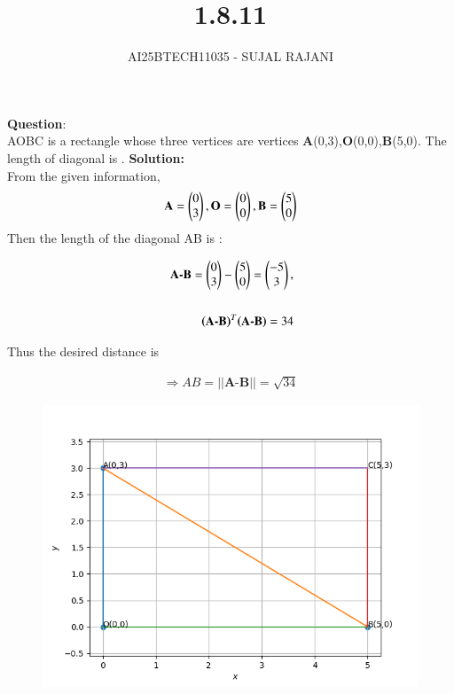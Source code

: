 \documentclass[journal,12pt,onecolumn]{IEEEtran}
\begin{document}
\title{1.8.11}
\author{AI25BTECH11035 - SUJAL RAJANI}
{\let\newpage\relax\maketitle}
\textbf{Question}:
\\
\noindent AOBC is a rectangle whose three vertices are vertices \textbf{A}(0,3),\textbf{O}(0,0),\textbf{B}(5,0). The 
length of diagonal is \underline{\hspace{2cm}}.
\textbf{Solution:} 
\\
From the given information,
\begin{align}
			\textbf{A} = \begin{pmatrix}0\\3\end{pmatrix},\textbf{O} = \begin{pmatrix}0\\0\end{pmatrix},\textbf{B} = \begin{pmatrix}5\\0\end{pmatrix} 
\end{align}
Then the length of the diagonal AB is :

\begin{align}
   \textbf{ A-B}=\begin{pmatrix}0\\3\end{pmatrix}-\begin{pmatrix}5\\0\end{pmatrix}=\begin{pmatrix}-5\\3\end{pmatrix},
    \\
    \\
    \textbf{(A-B)}^T\textbf{(A-B)}=34
    \end{align}
    
    Thus the desired distance is
    
    \begin{align}
     \Rightarrow AB=||\textbf{A-B}||=\sqrt{34}	 
    \end{align}
    
    \begin{figure}[H]
    \centering
    \includegraphics[width = 0.7\columnwidth]{figs/img.png}
    \caption*{}
    \label{figs}
\end{figure}
\end{document}

